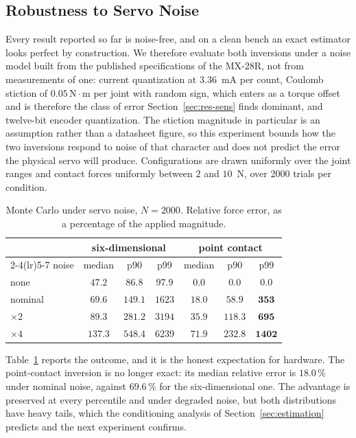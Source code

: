 \documentclass{ieeeaccess}
\begin{document}
\subsection{Robustness to Servo Noise}
\label{sec:res-noise}
Every result reported so far is noise-free, and on a clean bench an exact
estimator looks perfect by construction. We therefore evaluate both inversions
under a noise model built from the published specifications of the MX-28R, not
from measurements of one: current quantization at
$3.36$~mA per count, Coulomb stiction of $0.05\,\mathrm{N}\cdot\mathrm{m}$ per
joint with random sign, which enters as a torque offset and is therefore the
class of error Section~\ref{sec:res-sens} finds dominant, and twelve-bit encoder
quantization. The stiction magnitude in
particular is an assumption rather than a datasheet figure, so this experiment
bounds how the two inversions respond to noise of that character and does not
predict the error the physical servo will produce.
Configurations are drawn uniformly over the joint ranges and contact forces
uniformly between $2$ and $10$~N, over $2000$ trials per condition.

\begin{table}[!t]
\caption{Monte Carlo under servo noise, $N=2000$. Relative force error, as a
percentage of the applied magnitude.}
\label{tab:noise}
\centering
\footnotesize
\setlength{\tabcolsep}{3.5pt}
\begin{tabular}{lcccccc}
\toprule
& \multicolumn{3}{c}{six-dimensional} & \multicolumn{3}{c}{point contact}\\
\cmidrule(lr){2-4}\cmidrule(lr){5-7}
noise & median & p90 & p99 & median & p90 & p99\\
\midrule
none          & $47.2$  & $86.8$  & $97.9$   & $\bm{0.0}$  & $\bm{0.0}$  & $\bm{0.0}$\\
nominal       & $69.6$  & $149.1$ & $1623$   & $\bm{18.0}$ & $\bm{58.9}$ & $\bm{353}$\\
$\times2$     & $89.3$  & $281.2$ & $3194$   & $\bm{35.9}$ & $\bm{118.3}$& $\bm{695}$\\
$\times4$     & $137.3$ & $548.4$ & $6239$   & $\bm{71.9}$ & $\bm{232.8}$& $\bm{1402}$\\
\bottomrule
\end{tabular}
\end{table}

Table~\ref{tab:noise} reports the outcome, and it is the honest expectation for
hardware. The point-contact inversion is no longer exact: its median relative
error is $18.0\,\%$ under nominal noise, against $69.6\,\%$ for the
six-dimensional one. The advantage is preserved at every percentile and under
degraded noise, but both distributions have heavy tails, which the conditioning
analysis of Section~\ref{sec:estimation} predicts and the next experiment
confirms.
\end{document}
